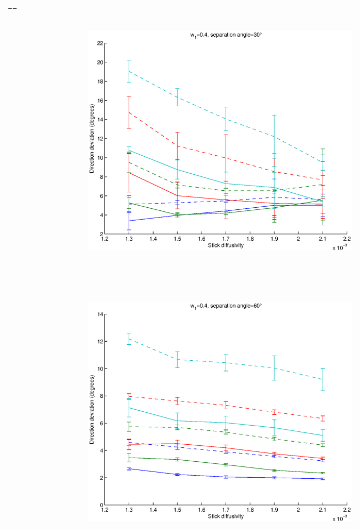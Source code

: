 \documentclass{article}
\begin{document}
\begin{figure}[H]
\begin{adjustwidth}{-\oddsidemargin}{-\rightmargin}
  \begin{subfigure}{0.8\paperwidth}
    \begin{subfigure}{0.3\textwidth}
      \centering
      \includegraphics[width=\textwidth]{figures/synth_modbas_weights_diffus__snr=20__w1=4__angle=30.eps}
    \end{subfigure}
      ~
      \begin{subfigure}{0.3\textwidth}
        \centering
        \includegraphics[width=\textwidth]{figures/synth_modbas_weights_diffus__snr=20__w1=4__angle=60.eps}
      \end{subfigure}

\end{subfigure}
\end{adjustwidth}
\end{figure}
\end{document}

